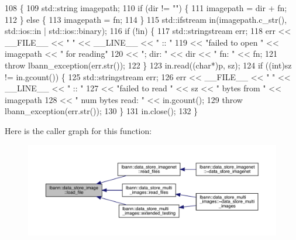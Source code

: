 \begin{DoxyCode}
108                                                                                                        \{
109   std::string imagepath;
110   \textcolor{keywordflow}{if} (dir != \textcolor{stringliteral}{""}) \{
111     imagepath = dir + fn;
112   \} \textcolor{keywordflow}{else} \{
113     imagepath = fn;
114   \}
115   std::ifstream in(imagepath.c\_str(), std::ios::in | std::ios::binary);
116   \textcolor{keywordflow}{if} (!in) \{
117     std::stringstream err;
118     err << \_\_FILE\_\_ << \textcolor{stringliteral}{" "} << \_\_LINE\_\_ << \textcolor{stringliteral}{" :: "}
119         << \textcolor{stringliteral}{"failed to open "} << imagepath << \textcolor{stringliteral}{" for reading"}
120         << \textcolor{stringliteral}{"; dir: "} << dir << \textcolor{stringliteral}{"  fn: "} << fn;
121     \textcolor{keywordflow}{throw} lbann\_exception(err.str());
122   \}
123   in.read((\textcolor{keywordtype}{char}*)p, sz);
124   \textcolor{keywordflow}{if} ((\textcolor{keywordtype}{int})sz != in.gcount()) \{
125     std::stringstream err;
126     err << \_\_FILE\_\_ << \textcolor{stringliteral}{" "} << \_\_LINE\_\_ << \textcolor{stringliteral}{" :: "}
127         << \textcolor{stringliteral}{"failed to read "} << sz << \textcolor{stringliteral}{" bytes from "} << imagepath
128         << \textcolor{stringliteral}{" num bytes read: "} << in.gcount();
129     \textcolor{keywordflow}{throw} lbann\_exception(err.str());
130   \}
131   in.close();
132 \}
\end{DoxyCode}
Here is the caller graph for this function\+:\nopagebreak
\begin{figure}[H]
\begin{center}
\leavevmode
\includegraphics[width=350pt]{classlbann_1_1data__store__image_a8a53bab58d75554821f90c38d14078aa_icgraph}
\end{center}
\end{figure}
\mbox{\label{classlbann_1_1data__store__image_a997fd4f7961b173e1b03dfe1d81ad96f}} 
